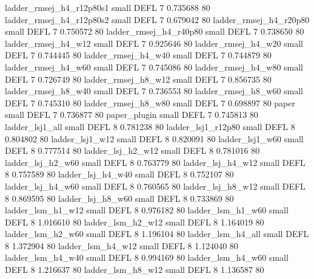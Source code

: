 ladder_rmsej_h4_r12p80s1      small     DEFL                 7 0.735688 80
ladder_rmsej_h4_r12p80s2      small     DEFL                 7 0.679042 80
  ladder_rmsej_h4_r20p80      small     DEFL                 7 0.750572 80
  ladder_rmsej_h4_r40p80      small     DEFL                 7 0.738650 80
     ladder_rmsej_h4_w12      small     DEFL                 7 0.925646 80
     ladder_rmsej_h4_w20      small     DEFL                 7 0.744445 80
     ladder_rmsej_h4_w40      small     DEFL                 7 0.744879 80
     ladder_rmsej_h4_w60      small     DEFL                 7 0.745086 80
     ladder_rmsej_h4_w80      small     DEFL                 7 0.726749 80
     ladder_rmsej_h8_w12      small     DEFL                 7 0.856735 80
     ladder_rmsej_h8_w40      small     DEFL                 7 0.736553 80
     ladder_rmsej_h8_w60      small     DEFL                 7 0.745310 80
     ladder_rmsej_h8_w80      small     DEFL                 7 0.698897 80
                   paper      small     DEFL                 7 0.736877 80
            paper_plugin      small     DEFL                 7 0.745813 80
         ladder_lsj1_all      small     DEFL                 8 0.781238 80
      ladder_lsj1_r12p80      small     DEFL                 8 0.804802 80
         ladder_lsj1_w12      small     DEFL                 8 0.820091 80
         ladder_lsj1_w60      small     DEFL                 8 0.777514 80
       ladder_lsj_h2_w12      small     DEFL                 8 0.781016 80
       ladder_lsj_h2_w60      small     DEFL                 8 0.763779 80
       ladder_lsj_h4_w12      small     DEFL                 8 0.757589 80
       ladder_lsj_h4_w40      small     DEFL                 8 0.752107 80
       ladder_lsj_h4_w60      small     DEFL                 8 0.760565 80
       ladder_lsj_h8_w12      small     DEFL                 8 0.869595 80
       ladder_lsj_h8_w60      small     DEFL                 8 0.733869 80
       ladder_lsm_h1_w12      small     DEFL                 8 0.976182 80
       ladder_lsm_h1_w60      small     DEFL                 8 1.016610 80
       ladder_lsm_h2_w12      small     DEFL                 8 1.164019 80
       ladder_lsm_h2_w60      small     DEFL                 8 1.196104 80
       ladder_lsm_h4_all      small     DEFL                 8 1.372904 80
       ladder_lsm_h4_w12      small     DEFL                 8 1.124040 80
       ladder_lsm_h4_w40      small     DEFL                 8 0.994169 80
       ladder_lsm_h4_w60      small     DEFL                 8 1.216637 80
       ladder_lsm_h8_w12      small     DEFL                 8 1.136587 80
